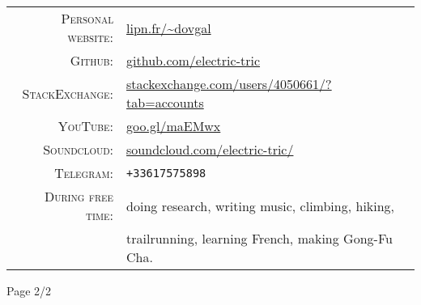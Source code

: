 \documentclass[a4paper,10pt]{article} %
\begin{document}
\begin{tabular}{rl}
\textsc{Personal website:} & \url{lipn.fr/~dovgal}\\

\textsc{Github:} & \url{github.com/electric-tric}\\

\textsc{StackExchange:} &
\url{stackexchange.com/users/4050661/?tab=accounts}
\\

\textsc{YouTube:} & \url{goo.gl/maEMwx}\\

\textsc{Soundcloud:} & \url{soundcloud.com/electric-tric/}\\

\textsc{Telegram:} & \texttt{+33617575898}\\

\textsc{During free time:} &
doing research, writing music, climbing, hiking,
\\ & trailrunning, learning French, making Gong-Fu Cha.
\end{tabular}
\fi

Page 2/2
\end{document}
